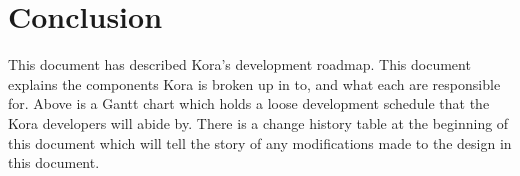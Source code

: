 \documentclass[onecolumn, draftclsnofoot,10pt, compsoc]{IEEEtran}
\begin{document}
			
\section{Conclusion}
	This document has described Kora's development roadmap.
	This document explains the components Kora is broken up in to, and what each are responsible for.
	Above is a Gantt chart which holds a loose development schedule that the Kora developers will abide by.
	There is a change history table at the beginning of this document which will tell the story of any modifications made to the design in this document.



%
%
\end{document}
